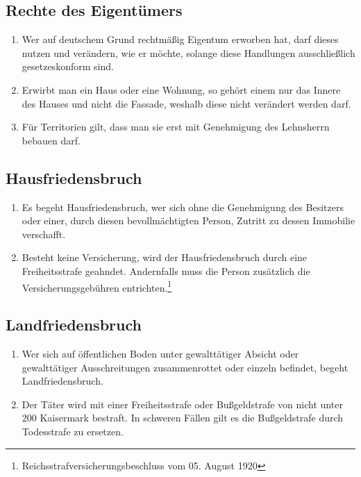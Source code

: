 \documentclass{article}
\begin{document}
\subsection{Rechte des Eigentümers}
\begin{enumerate}[(1)]
    \item Wer auf deutschem Grund rechtmäßig Eigentum erworben hat, darf dieses nutzen und verändern, wie er möchte, solange diese Handlungen ausschließlich gesetzeskonform sind.
    \item Erwirbt man ein Haus oder eine Wohnung, so gehört einem nur das Innere des Hauses und nicht die Fassade, weshalb diese nicht verändert werden darf.
    \item Für Territorien gilt, dass man sie erst mit Genehmigung des Lehnsherrn bebauen darf.
\end{enumerate}

\subsection{Hausfriedensbruch}\label{hausfr}
\begin{enumerate}[(1)]
    \item Es begeht Hausfriedensbruch, wer sich ohne die Genehmigung des Besitzers oder einer, durch diesen bevollmächtigten Person, Zutritt zu dessen Immobilie verschafft.
    \item Besteht keine Versicherung, wird der Hausfriedensbruch durch eine Freiheitsstrafe geahndet. Andernfalls muss die Person zusätzlich die Versicherungsgebühren entrichten.\footnote{Reichsstrafversicherungsbeschluss vom 05. August 1920}
\end{enumerate}

\subsection{Landfriedensbruch}
\begin{enumerate}[(1)]
    \item Wer sich auf öffentlichen Boden unter gewalttätiger Absicht oder gewalttätiger Ausschreitungen zusammenrottet oder einzeln befindet, begeht Landfriedensbruch.
    \item Der Täter wird mit einer Freiheitsstrafe oder Bußgeldstrafe von nicht unter 200 Kaisermark bestraft. In schweren Fällen gilt es die Bußgeldstrafe durch Todesstrafe zu ersetzen.
\end{enumerate}
\end{document}
